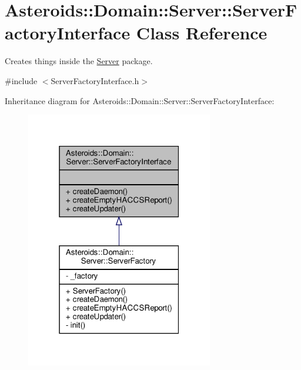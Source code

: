 \hypertarget{classAsteroids_1_1Domain_1_1Server_1_1ServerFactoryInterface}{}\section{Asteroids\+:\+:Domain\+:\+:Server\+:\+:Server\+Factory\+Interface Class Reference}
\label{classAsteroids_1_1Domain_1_1Server_1_1ServerFactoryInterface}


Creates things inside the \hyperlink{namespaceAsteroids_1_1Domain_1_1Server}{Server} package.  




{\ttfamily \#include $<$Server\+Factory\+Interface.\+h$>$}



Inheritance diagram for Asteroids\+:\+:Domain\+:\+:Server\+:\+:Server\+Factory\+Interface\+:\nopagebreak
\begin{figure}[H]
\begin{center}
\leavevmode
\includegraphics[width=232pt]{classAsteroids_1_1Domain_1_1Server_1_1ServerFactoryInterface__inherit__graph}
\end{center}
\end{figure}


